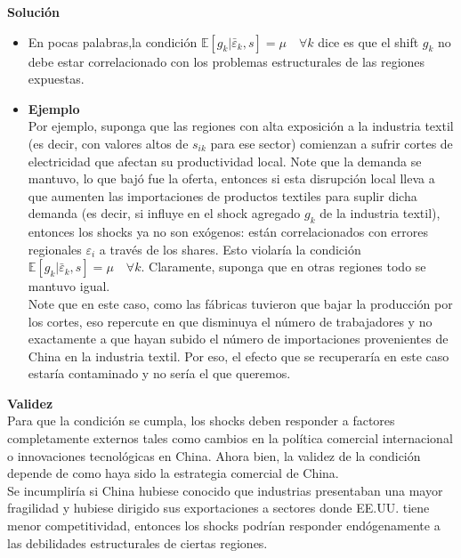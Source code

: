 \documentclass[a4paper, answers, addpoints, 11pt]{exam}
\newenvironment{solucion}{%
  \begin{mdframed}[
    backgroundcolor=blue!5,    %
    linecolor=blue!50,          %
    linewidth=2pt,              %
    leftmargin=10pt,            %
    rightmargin=8pt,           %
    topline=true,              %
    bottomline=true,            %
    roundcorner=10pt,           %
    innerleftmargin=10pt,       %
    innerrightmargin=10pt,      %
    innerbottommargin=10pt,     %
    innertopmargin=10pt         %
  ]%
  \begin{tcolorbox}[colframe=blue!50!black, colback=blue!50, coltitle=white, sharp corners=all, boxrule=1mm, width=\textwidth, halign=left, valign=center, top=0mm, bottom=0mm, left=0mm, right=0mm] \textbf{Solución} \end{tcolorbox} }{\end{mdframed}}
\begin{document}
\begin{enumerate}
\begin{solucion}
\begin{itemize}
    \item  En pocas palabras,la condición $ \mathbb{E}[g_k | \bar{\varepsilon}_k, s] = \mu \quad \forall k$ dice es que el shift $g_k$  no debe estar correlacionado con los problemas estructurales de las regiones expuestas. 
     
    \item  \textbf{Ejemplo}\\
    Por ejemplo, suponga que las regiones con alta exposición a la industria textil (es decir, con valores altos de $s_{ik}$
  para ese sector) comienzan a sufrir cortes de electricidad que afectan su productividad local. Note que la demanda se mantuvo, lo que bajó fue la oferta, entonces si esta disrupción local lleva a que aumenten las importaciones de productos textiles para suplir dicha demanda (es decir, si influye en el shock agregado $g_k$
de la industria textil), entonces los shocks ya no son exógenos: están correlacionados con errores regionales $\varepsilon_i$
  a través de los shares. Esto violaría la condición $ \mathbb{E}[g_k | \bar{\varepsilon}_k, s] = \mu \quad \forall k.$ Claramente, suponga que en otras regiones todo se mantuvo igual.\\
  
    Note que en este caso, como las fábricas tuvieron que bajar la producción por los cortes, eso repercute en que disminuya el número de trabajadores y no exactamente a que hayan subido el número de importaciones provenientes de China en la industria textil. Por eso, el efecto que se recuperaría en este caso estaría contaminado y no sería el que queremos. 


     \end{itemize} 
     
   

    \textbf{Validez}\\
    Para que la condición se cumpla, los shocks 
    deben responder a factores completamente externos tales como cambios en la política comercial internacional o innovaciones tecnológicas en China. Ahora bien, la validez de la condición depende de como haya sido la estrategia comercial de China. \\
    
    Se incumpliría si China hubiese conocido que industrias presentaban una mayor fragilidad y hubiese dirigido sus exportaciones a sectores donde EE.UU. tiene menor competitividad, entonces los shocks podrían responder endógenamente a las debilidades estructurales de ciertas regiones.\\


\end{solucion}
\end{enumerate}
\end{document}
